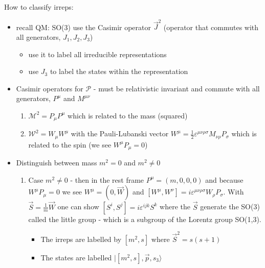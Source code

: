 \documentclass[10pt,a4paper]{book}
\theoremstyle{definition}
\begin{document}
How to classify irreps:
\begin{itemize}
\item recall QM: SO(3) use the Casimir operator $\vec{J}^2$ (operator that commutes with all generators, $J_1, J_2, J_3$) 
\begin{itemize}
\item use it to label all irreducible representations
\item use $J_3$ to label the states within the representation
\end{itemize}  
\item Casimir operators for $\mathcal{P}$ - must be relativistic invariant and commute with all generators, $P^\mu$ and $M^{\mu\nu}$
\begin{enumerate}
\item $\mathcal{M}^2=P_\mu P^\mu$ which is related to the mass (squared)
\item $\mathcal{W}^2=W_\mu W^{\mu}$ with the Pauli-Lubanski vector $W^\mu=\frac{1}{2}\varepsilon^{\mu\nu\rho\sigma}M_{\nu\rho}P_\sigma$ which is related to the spin (we see $W^\mu P_\mu=0$)
\end{enumerate}
\item Distinguish between mass $m^2=0$ and $m^2\neq0$
\begin{enumerate}
\item Case $m^2\neq0$ - then in the rest frame $P^\mu=(m,0,0,0)$ and because $W^\mu P_\mu=0$ we see $W^\mu=(0,\vec{W})$ and $[W^\mu,W^\nu]=i\varepsilon^{\mu\nu\rho\sigma}W_\rho P_\sigma$. With $\vec{S}=\frac{1}{m}\vec{W}$ one can show $[S^i,S^j]=i\varepsilon^{ijk}S^k$ where the $\vec{S}$ generate the SO(3) called the little group - which is a subgroup of the Lorentz group SO(1,3).
\begin{itemize}
\item The irreps are labelled by $[m^2,s]$ where $\vec{S}^2=s(s+1)$
\item The states are labelled $|[m^2,s],\vec{p},s_3\rangle$
\end{itemize} 



\end{enumerate}
\end{itemize}
\end{document}
